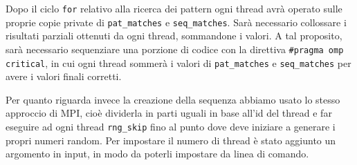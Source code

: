 \documentclass[12pt,openany]{report}
\begin{document}
Dopo il ciclo \texttt{for} relativo alla ricerca dei pattern ogni thread avrà operato sulle proprie copie private di \texttt{pat\_matches} e \texttt{seq\_matches}. Sarà necessario collossare i risultati parziali ottenuti da ogni thread, sommandone i valori.
A tal proposito, sarà necessario sequenziare una porzione di codice con la direttiva \texttt{\#pragma omp critical}, in cui ogni thread sommerà i valori di \texttt{pat\_matches} e \texttt{seq\_matches} per avere i valori finali corretti.\bigskip

Per quanto riguarda invece la creazione della sequenza abbiamo usato lo stesso approccio di MPI, cioè dividerla in parti uguali in base all'id del thread e far eseguire ad ogni thread \texttt{rng\_skip} fino al punto dove deve iniziare a generare i propri numeri random. Per impostare il numero di thread è stato aggiunto un argomento in input, in modo da poterli impostare da linea di comando.\bigskip
\end{document}
